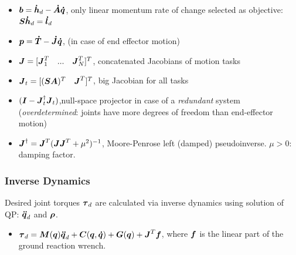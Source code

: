 \begin{itemize}
\item $\boldsymbol{b} = \boldsymbol{\dot{h}}_d - \boldsymbol{\dot{A}}\boldsymbol{\dot{q}}$, \quad only linear momentum rate of change selected as objective: $\boldsymbol{S}\boldsymbol{\dot{h}}_d=\boldsymbol{\dot{l}}_d$
\item $\boldsymbol{p} = \boldsymbol{\dot{T}} - \boldsymbol{\dot{J}}\boldsymbol{\dot{q}}$, \quad (in case of end effector motion)
\item $\boldsymbol{J}= [\boldsymbol{J}_1^T\quad...\quad\boldsymbol{J}_N^T]^T$, \quad concatenated Jacobians of motion tasks
\item $\boldsymbol{J}_t = [(\boldsymbol{S}\boldsymbol{A})^T\quad \boldsymbol{J}^T]^T$, \quad big Jacobian for all tasks
\item $(\boldsymbol{I} - \boldsymbol{J}_t^{\dagger}\boldsymbol{J}_t)$,\quad null-space projector in case of a \textit{redundant} system (\textit{overdetermined}: joints have more degrees of freedom than end-effector motion)
\item $\boldsymbol{J}^{\dagger} = \boldsymbol{J}^T(\boldsymbol{J}\boldsymbol{J}^T +\mu^2)^{-1}$, \quad Moore-Penrose left (damped) pseudoinverse. $\mu>0$: damping factor. 

\end{itemize}

\subsubsection{Inverse Dynamics}
Desired joint torques $\boldsymbol{\tau}_d$ are calculated via inverse dynamics using solution of QP: $\boldsymbol{\ddot{q}}_d$ and $\boldsymbol{\rho}$.\\
\begin{itemize}
    \item  $\boldsymbol{\tau}_d = \boldsymbol{M}(\boldsymbol{q})\boldsymbol{\ddot{q}}_d + \boldsymbol{C}(\boldsymbol{q},\boldsymbol{\dot{q}}) + \boldsymbol{G}(\boldsymbol{q}) + \boldsymbol{J}^T \boldsymbol{f}$, \quad where $\boldsymbol{f}$ is the linear part of the ground reaction wrench.
\end{itemize}
